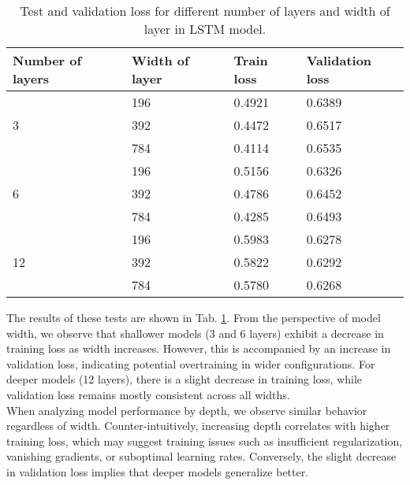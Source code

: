 \begin{table}[!h]
	\centering
	\begin{tabular}{|l|l|l|l|}
		\hline
		Number of layers    & Width of layer & Train loss & Validation loss \\ \hline
		\multirow{3}{*}{3}  & 196               &  0.4921         & 0.6389                \\ \cline{2-4} 
		& 392              &  0.4472         & 0.6517                \\ \cline{2-4} 
		& 784              & 0.4114          & 0.6535                \\ \hline
		\multirow{3}{*}{6}  & 196               & 0.5156          & 0.6326                \\ \cline{2-4} 
		& 392              & 0.4786          &   0.6452              \\ \cline{2-4} 
		& 784              & 0.4285          &  0.6493               \\ \hline
		\multirow{3}{*}{12} & 196               & 0.5983          & 0.6278                \\ \cline{2-4} 
		& 392              & 0.5822          & 0.6292                \\ \cline{2-4} 
		& 784              & 0.5780          & 0.6268                \\ \hline
	\end{tabular}
	\caption{Test and validation loss for different number of layers and width of layer in LSTM model.}
	\label{tab:lstm_train}
\end{table}

The results of these tests are shown in Tab. \ref{tab:lstm_train}. From the perspective of model width, we observe that shallower models (3 and 6 layers) exhibit a decrease in training loss as width increases. However, this is accompanied by an increase in validation loss, indicating potential overtraining in wider configurations. For deeper models (12 layers), there is a slight decrease in training loss, while validation loss remains mostly consistent across all widths.
\\

When analyzing model performance by depth, we observe similar behavior regardless of width. Counter-intuitively, increasing depth correlates with higher training loss, which may suggest training issues such as insufficient regularization, vanishing gradients, or suboptimal learning rates. Conversely, the slight decrease in validation loss implies that deeper models generalize better.
\\

